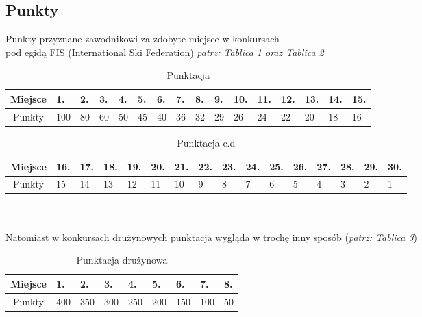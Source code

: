 \documentclass[11pt]{article}
\begin{document}
\subsection{Punkty}
Punkty przyznane zawodnikowi za zdobyte miejsce w konkursach \\pod egidą FIS (International Ski Federation) \textit{\small patrz: Tablica 1 oraz Tablica 2}
\begin{table}
\caption{Punktacja}
\begin{center}
\begin{tabular}{|c|l|l|l|l|l|l|l|l|l|l|l|l|l|l|l|}
\hline Miejsce & 1. & 2. & 3. & 4. & 5. & 6. & 7. & 8. & 9. & 10. & 11. & 12. & 13. & 14. & 15. \\ \hline \hline
Punkty & 100 & 80 & 60 & 50 & 45 & 40 & 36 & 32 & 29 & 26 & 24 & 22 & 20 & 18 & 16 \\ \hline
\end{tabular}
\end{center}
\end{table}
\begin{table}
\caption{Punktacja c.d}
\begin{center}
\begin{tabular}{|c|l|l|l|l|l|l|l|l|l|l|l|l|l|l|l|}
\hline Miejsce & 16. & 17. & 18. & 19. & 20. & 21. & 22. & 23. & 24. & 25. & 26. & 27. & 28. & 29. & 30.  \\ \hline \hline
Punkty & 15 & 14 & 13 & 12 & 11 & 10 & 9 & 8 & 7 & 6 & 5 & 4 & 3 & 2 & 1 \\ \hline
\end{tabular}
\end{center}
\end{table}
\\\\
Natomiast w konkursach drużynowych punktacja wygląda w trochę inny sposób (\textit{\small patrz: Tablica 3})
\begin{table}
\caption{Punktacja drużynowa}
\begin{center}
\begin{tabular}{|c|l|l|l|l|l|l|l|l|}
\hline Miejsce & 1. & 2. & 3. & 4. & 5. & 6. & 7. & 8. \\ \hline \hline
Punkty & 400 & 350 & 300 & 250 & 200 & 150 & 100 & 50 \\ \hline
\end{tabular}
\end{center}
\end{table}
\end{document}
